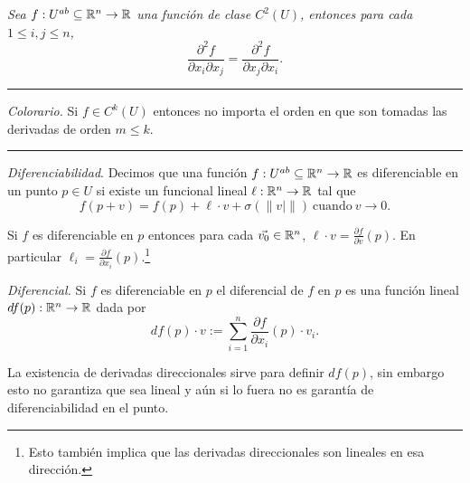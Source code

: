 \vspace{0.2in}

\begin{theorem}[Schwarz]
    \itshape Sea \(f:U^{ab}\subseteq \mathbb{R}^n \rightarrow \mathbb{R}\) una función de clase \(C^2(U)\), entonces para cada \(1\leq i,j\leq n\),  
    \[\frac{\partial^2 f}{\partial x_i \partial x_j} = \frac{\partial^2 f }{\partial x_j \partial x_i}.\]
\end{theorem}

\vspace{0.2in}

\hrule 
\begin{exercise}
    \emph{Colorario.} Si \(f\in C^k(U)\) entonces no importa el orden en que son tomadas las derivadas de orden \(m\leq k\). 
\end{exercise}
\hrule 

\vspace{0.2in}

\begin{definition}
    \emph{Diferenciabilidad}. Decimos que una función \(f:U^{ab}\subseteq \mathbb{R}^n \rightarrow \mathbb{R}\) es diferenciable en un punto \(p\in U \) si existe un funcional lineal \(\ell : \mathbb{R}^n \rightarrow \mathbb{R}\) tal que 
    \[f(p+v) = f(p) + \ell\cdot v + \sigma(\|v|\|)\ \text{cuando} \ v\to 0. \]
\end{definition}
\begin{proposition}
    Si \(f\) es diferenciable en \(p\) entonces para cada \(\vec{v_0}\in \mathbb{R}^n\), \(\ell \cdot v = \frac{\partial f }{\partial v}(p)\). En particular \(\ell_i = \frac{\partial f}{\partial x_i}(p)\).\footnote{Esto también implica que las derivadas direccionales son lineales en esa dirección.}
\end{proposition}
\begin{definition}
    \emph{Diferencial.} Si \(f\) es diferenciable en \(p\) el diferencial de \(f\) en \(p\) es una función lineal \(df(p): \mathbb{R}^n \rightarrow \mathbb{R}\) dada por 
    \[df(p)\cdot v := \sum_{i=1}^n \frac{\partial f}{\partial x_i}(p)\cdot v_i.\]
\end{definition}
\begin{note}
    La existencia de derivadas direccionales sirve para definir \(df(p)\), sin embargo esto no garantiza que sea lineal y aún si lo fuera no es garantía de diferenciabilidad en el punto. 
\end{note}

\vspace{0.2in}